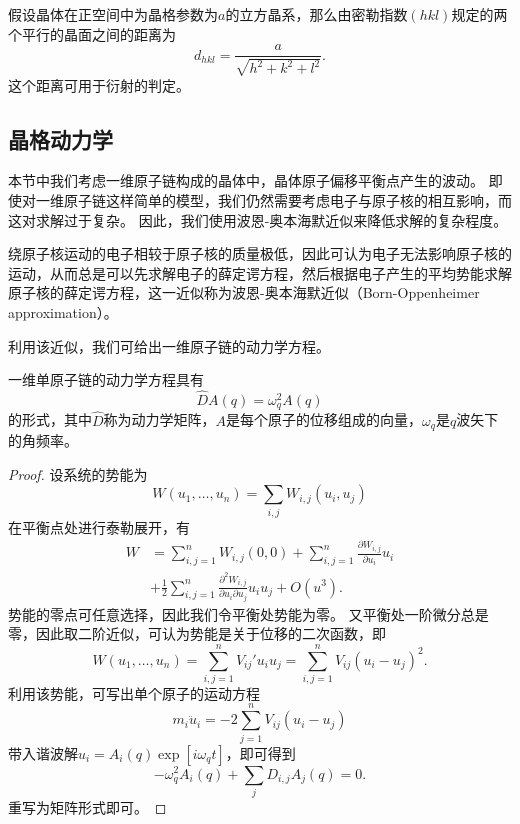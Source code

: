 假设晶体在正空间中为晶格参数为$a$的立方晶系，那么由密勒指数$(hkl)$规定的两个平行的晶面之间的距离为
\begin{equation}
    d_{hkl} = \frac{a}{\sqrt{h^2 + k^2 + l^2}}.
\end{equation}
这个距离可用于衍射的判定。

\subsection{晶格动力学}
本节中我们考虑一维原子链构成的晶体中，晶体原子偏移平衡点产生的波动。
即使对一维原子链这样简单的模型，我们仍然需要考虑电子与原子核的相互影响，而这对求解过于复杂。
因此，我们使用波恩-奥本海默近似来降低求解的复杂程度。
\begin{theorem}
    绕原子核运动的电子相较于原子核的质量极低，因此可认为电子无法影响原子核的运动，从而总是可以先求解电子的薛定谔方程，然后根据电子产生的平均势能求解原子核的薛定谔方程，这一近似称为波恩-奥本海默近似（Born-Oppenheimer approximation）。
\end{theorem}

利用该近似，我们可给出一维原子链的动力学方程。
\begin{proposition}
    一维单原子链的动力学方程具有
    \begin{equation}
        \hat D A(q) = \omega_q^2 A(q)
    \end{equation}
    的形式，其中$\hat D$称为动力学矩阵，$A$是每个原子的位移组成的向量，$\omega_q$是$q$波矢下的角频率。
\end{proposition}

\begin{proof}\small
    设系统的势能为
    \begin{equation}
        W(u_1, \dots, u_n) = \sum_{i,j} W_{i,j} (u_i, u_j)
    \end{equation}
    在平衡点处进行泰勒展开，有
    \begin{equation}
        \begin{aligned}
            W &= \sum_{i,j=1}^n W_{i,j}(0,0) + \sum_{i,j=1}^n \frac{\partial W_{i,j}}{\partial u_i} u_i \\
            &+ \frac{1}{2} \sum_{i,j=1}^n \frac{\partial^2 W_{i,j}}{\partial u_i \partial u_j} u_i u_j + O(u^3).
        \end{aligned}
    \end{equation}
    势能的零点可任意选择，因此我们令平衡处势能为零。
    又平衡处一阶微分总是零，因此取二阶近似，可认为势能是关于位移的二次函数，即
    \begin{equation}
        W(u_1, \dots, u_n) = \sum_{i,j=1}^n V_{ij}' u_i u_j  = \sum_{i,j=1}^n V_{ij} (u_i - u_j)^2.
    \end{equation}
    利用该势能，可写出单个原子的运动方程
    \begin{equation}
        m_i \ddot u_i = - 2 \sum_{j=1}^n V_{ij}(u_i - u_j)
    \end{equation}
    带入谐波解$u_i = A_i(q) \exp[i \omega_q t]$，即可得到
    \begin{equation}
        - \omega_q^2 A_i(q) + \sum_j D_{i,j} A_j(q) = 0.
    \end{equation}
    重写为矩阵形式即可。
\end{proof}

